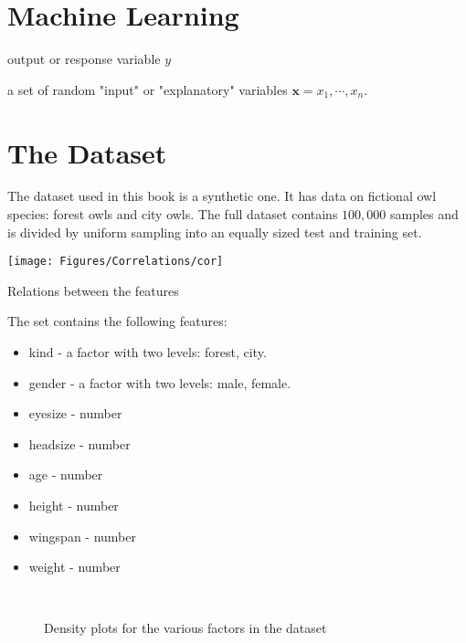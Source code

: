 \documentclass[11pt,a4paper,oldtoc,final]{tufte-book}
\newcommand{\ranvars}[1]{\ensuremath{ \mathbf{#1} }}
\begin{document}
\chapter{Machine Learning}


\cite{friedman2000greedy} %

output or response variable $y$

a set of random "input" or "explanatory" variables
$\ranvars{x} = {x_1, \cdots, x_n}$.


\chapter{The Dataset}

The dataset used in this book is a synthetic one.
It has data on fictional owl species: forest owls and city owls.
 
The full dataset contains $100,000$ samples and is divided by uniform sampling
into an equally sized test and training set.

\begin{marginfigure}
    \texttt{[image: Figures/Correlations/cor]}
    \caption{Relations between the features}
\end{marginfigure}

The set contains the following features:
\begin{itemize}
    \item kind     - a factor with two levels: forest, city.
    \item gender   - a factor with two levels: male, female.
    \item eyesize  - number
    \item headsize - number
    \item age      - number
    \item height   - number
    \item wingspan - number
    \item weight   - number
\end{itemize}


\begin{figure*}
     \\
     \caption{Density plots for the various factors in the dataset}
\end{figure*}
\end{document}
